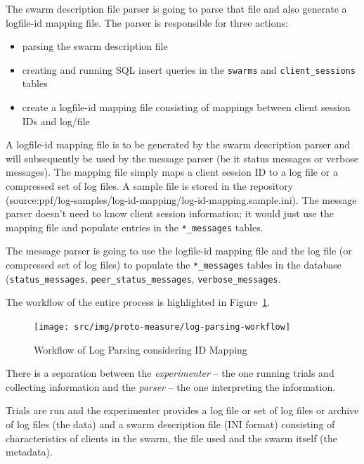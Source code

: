 The swarm description file parser is going to parse that file and also generate a logfile-id mapping file. The parser is responsible for three actions:
\begin{itemize}
  \item parsing the swarm description file
  \item creating and running SQL insert queries in the \texttt{swarms} and
  \texttt{client\_sessions} tables
  \item create a logfile-id mapping file consisting of mappings between client
  session IDs and log/file
\end{itemize}

A logfile-id mapping file is to be generated by the swarm description parser
and will subsequently be used by the message parser (be it status messages or
verbose messages). The mapping file simply maps a client session ID to a log
file or a compressed set of log files. A sample file is stored in the
repository (source:ppf/log-samples/log-id-mapping/log-id-mapping.sample.ini).
The message parser doesn't need to know client session information; it would
just use the mapping file and populate entries in the \texttt{*\_messages}
tables.

The message parser is going to use the logfile-id mapping file and the log
file (or compressed set of log files) to populate the \texttt{*\_messages}
tables in the database (\texttt{status\_messages},
\texttt{peer\_status\_messages}, \texttt{verbose\_messages}.

The workflow of the entire process is highlighted in
Figure~\ref{fig:proto-measure:log-parsing-workflow}.

\begin{figure}[htb]
  \begin{center}
    \texttt{[image: src/img/proto-measure/log-parsing-workflow]}
  \end{center}
  \caption{Workflow of Log Parsing considering ID Mapping}
  \label{fig:proto-measure:log-parsing-workflow}
\end{figure}

There is a separation between the \textit{experimenter} -- the one running
trials and collecting information and the \textit{parser} -- the one
interpreting the information.

Trials are run and the experimenter provides a log file or set of log files or
archive of log files (the data) and a swarm description file (INI format)
consisting of characteristics of clients in the swarm, the file used and the
swarm itself (the metadata).

